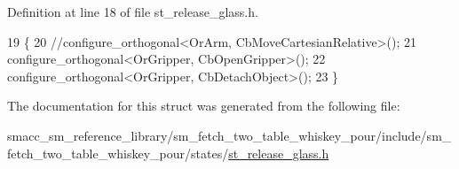 Definition at line 18 of file st\+\_\+release\+\_\+glass.\+h.


\begin{DoxyCode}
19         \{
20             \textcolor{comment}{//configure\_orthogonal<OrArm, CbMoveCartesianRelative>();}
21             configure\_orthogonal<OrGripper, CbOpenGripper>();
22             configure\_orthogonal<OrGripper, CbDetachObject>();
23         \}
\end{DoxyCode}


The documentation for this struct was generated from the following file\+:\begin{DoxyCompactItemize}
\item 
smacc\+\_\+sm\+\_\+reference\+\_\+library/sm\+\_\+fetch\+\_\+two\+\_\+table\+\_\+whiskey\+\_\+pour/include/sm\+\_\+fetch\+\_\+two\+\_\+table\+\_\+whiskey\+\_\+pour/states/\hyperlink{st__release__glass_8h}{st\+\_\+release\+\_\+glass.\+h}\end{DoxyCompactItemize}
